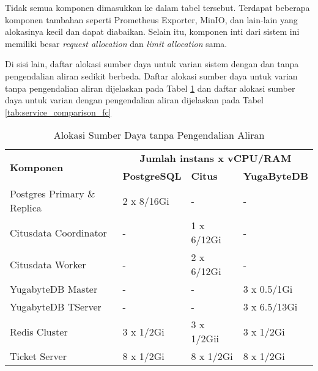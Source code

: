 Tidak semua komponen dimasukkan ke dalam tabel tersebut. Terdapat beberapa komponen tambahan seperti Prometheus Exporter, MinIO, dan lain-lain yang alokasinya kecil dan dapat diabaikan. Selain itu, komponen inti dari sistem ini memiliki besar \textit{request allocation} dan \textit{limit allocation} sama.

Di sisi lain, daftar alokasi sumber daya untuk varian sistem dengan dan tanpa pengendalian aliran sedikit berbeda. Daftar alokasi sumber daya untuk varian tanpa pengendalian aliran dijelaskan pada Tabel \ref{tab:nofc-allocation} dan daftar alokasi sumber daya untuk varian dengan pengendalian aliran dijelaskan pada Tabel \ref{tab:service_comparison_fc}

\begin{table}[H]
    \centering
    \caption{Alokasi Sumber Daya tanpa Pengendalian Aliran}
    \label{tab:nofc-allocation}
    \begin{tabular}{|l|l|l|l|}
        \hline
        \multirow{2}{*}{\textbf{Komponen}} & \multicolumn{3}{c|}{\textbf{Jumlah instans x vCPU/RAM}}                                        \\
        \cline{2-4}
                                           & \textbf{PostgreSQL}                                     & \textbf{Citus} & \textbf{YugaByteDB} \\
        \hline
        Postgres Primary \& Replica        & 2 x 8/16Gi                                              & -              & -                   \\ \hline
        Citusdata Coordinator              & -                                                       & 1 x 6/12Gi     & -                   \\ \hline
        Citusdata Worker                   & -                                                       & 2 x 6/12Gi     & -                   \\ \hline
        YugabyteDB Master                  & -                                                       & -              & 3 x 0.5/1Gi         \\ \hline
        YugabyteDB TServer                 & -                                                       & -              & 3 x 6.5/13Gi        \\ \hline
        Redis Cluster                      & 3 x 1/2Gi                                               & 3 x 1/2Gii     & 3 x 1/2Gi           \\ \hline
        Ticket Server                      & 8 x 1/2Gi                                               & 8 x 1/2Gi      & 8 x 1/2Gi           \\ \hline
    \end{tabular}
\end{table}

